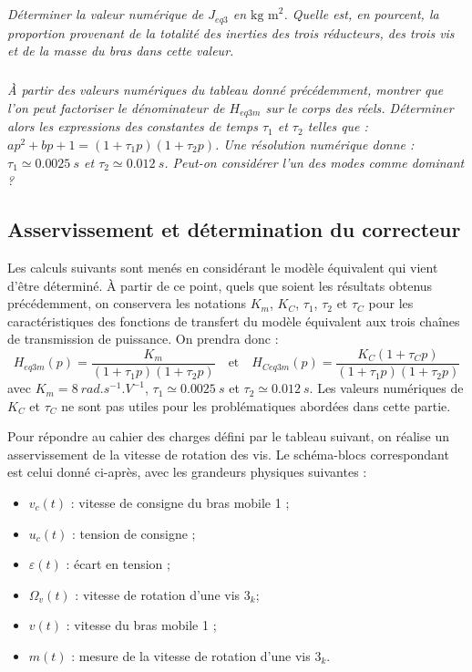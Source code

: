 \documentclass[10pt,fleqn]{article} %
\begin{document}
\subparagraph{}
\textit{Déterminer la valeur numérique de $J_{eq3}$ en $\text{kg m}^2$. Quelle est, en pourcent, la proportion provenant de la totalité des inerties des trois réducteurs, des trois vis et de la masse du bras
dans cette valeur.}

\subparagraph{}
\textit{À partir des valeurs numériques du tableau donné précédemment, montrer que l’on peut factoriser le
dénominateur de $H_{eq3m}$ sur le corps des réels. Déterminer alors les expressions des constantes de temps $\tau_1$ et $\tau_2$ telles que :
$ap^2 + bp + 1 = (1 + \tau_1p)(1 + \tau_2 p)$. 
Une résolution numérique donne : $\tau_1 \simeq \SI{0,0025}{s}$ et $\tau_2 \simeq \SI{0,012}{s}$. Peut-on considérer l’un des modes comme dominant ?}

\subsection{Asservissement et détermination du correcteur}
Les calculs suivants sont menés en considérant le modèle équivalent qui vient d’être déterminé. À  partir de ce point, quels que soient les résultats obtenus précédemment, on conservera  les notations $K_m$, $K_C$, $\tau_1$, $\tau_2$ et $\tau_C$  pour les caractéristiques des fonctions de transfert du modèle équivalent aux trois chaînes de transmission de puissance. On prendra donc :
$$
H_{eq3m}(p)=\dfrac{K_m}{\left(1+\tau_1 p\right)\left(1+\tau_2 p\right)} 
\quad
\text{et}
\quad
H_{Ceq3m}(p)=\dfrac{K_C\left(1+\tau_C p\right)}{\left(1+\tau_1 p\right)\left(1+\tau_2 p\right)} 
$$
avec $K_m  = \SI{8}{rad.s^{-1}.V^{-1}}$, $\tau_1\simeq \SI{0,0025}{s}$  et $\tau_2  \simeq \SI{0,012}{s}$. Les valeurs numériques de $K_C$  et $\tau_C$  ne sont pas utiles pour les problématiques abordées dans cette partie.

Pour répondre  au cahier  des charges défini par le tableau suivant, on réalise  un asservissement de la vitesse de rotation des vis. Le schéma-blocs correspondant est celui donné ci-après, avec les grandeurs physiques suivantes :
\begin{itemize}
\item $v_c (t)$ : vitesse de consigne du bras mobile 1 ;
\item $u_c (t)$ : tension de consigne ;
\item $\varepsilon(t)$ : écart en tension ;
\item $\Omega_v (t)$ : vitesse de rotation d’une vis $3_k$;
\item $v(t)$ : vitesse du bras mobile 1 ;
\item $m(t)$ : mesure de la vitesse de rotation d’une vis $3_k$.
\end{itemize}
\end{document}
